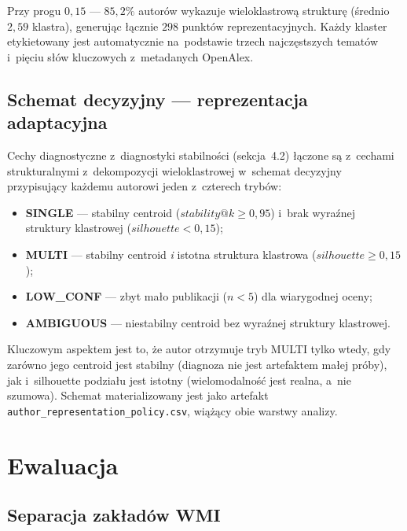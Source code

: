\documentclass[a4paper,11pt,twocolumn]{article}
\begin{document}
Przy progu $0{,}15$ --- $85{,}2\%$ autorów wykazuje wieloklastrową
strukturę (średnio $2{,}59$ klastra), generując łącznie $298$ punktów
reprezentacyjnych. Każdy klaster etykietowany jest automatycznie
na~podstawie trzech najczęstszych tematów i~pięciu słów kluczowych
z~metadanych OpenAlex.

\subsection{Schemat decyzyjny --- reprezentacja adaptacyjna}
\label{sec:adaptive}

Cechy diagnostyczne z~diagnostyki stabilności (sekcja~4.2) łączone
są z~cechami strukturalnymi z~dekompozycji wieloklastrowej w~schemat
decyzyjny przypisujący każdemu autorowi jeden z~czterech trybów:
\begin{itemize}
  \item \textbf{SINGLE} --- stabilny centroid ($stability@k \geq 0{,}95$)
        i~brak wyraźnej struktury klastrowej ($silhouette < 0{,}15$);
  \item \textbf{MULTI} --- stabilny centroid \emph{i} istotna struktura
        klastrowa ($silhouette \geq 0{,}15$);
  \item \textbf{LOW\_CONF} --- zbyt mało publikacji ($n < 5$) dla
        wiarygodnej oceny;
  \item \textbf{AMBIGUOUS} --- niestabilny centroid bez wyraźnej struktury
        klastrowej.
\end{itemize}

Kluczowym aspektem jest to, że autor otrzymuje tryb MULTI tylko wtedy,
gdy zarówno jego centroid jest stabilny (diagnoza nie jest artefaktem
małej próby), jak i~silhouette podziału jest istotny (wielomodalność
jest realna, a~nie szumowa). Schemat materializowany jest jako artefakt
\texttt{author\_representation\_policy.csv}, wiążący obie warstwy analizy.



\section{Ewaluacja}
\label{sec:eval}

\subsection{Separacja zakładów WMI}
\end{document}
